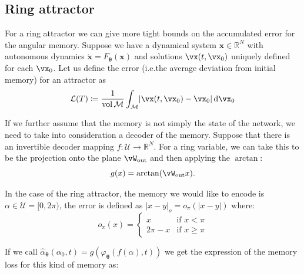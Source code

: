 \documentclass{article} %
\newcounter{ct}
\newcommand{\dm}[1]{\ensuremath{\mathrm{d}{#1}}} %
\newcommand{\wout}{\vW_{\text{out}}}
\newcommand{\manifold}{\mathcal{M}}
\DeclarePairedDelimiter{\abs}{\lvert}{\rvert}
\theoremstyle{definition}
\theoremstyle{remark}
\begin{document}
\subsection{Ring attractor}
For a ring attractor we can give more tight bounds on the accumulated error for the angular memory.
Suppose we have a dynamical system \(\bm{x} \in \mathbb{R}^N\) with autonomous dynamics \(\dot{ \bm{x}} = F_{\boldsymbol{\theta}} (\bm{x})\) and solutions \(\vx(t, \vx_0)\) uniquely defined for each \(\vx_0\).
Let us define the error (i.e.the  average deviation from initial memory) for an attractor as
\begin{align}
\mathcal{L}(T) \coloneqq
\frac{1}{\operatorname{vol}\manifold}\int_\manifold
\abs{\vx(t, \vx_0) - \vx_0}\,
\dm{\vx_0}
\end{align}

If we further assume that the memory is not simply the state of the network, we need to take into consideration a decoder of the memory.
Suppose that there is an invertible decoder mapping \(f: \mathcal{U} \rightarrow \mathbb{R}^N\). %
For a ring variable, we can take this to be the projection onto the plane \(\wout\) and then applying the \(\arctan\):
\begin{equation}
g(x) = \arctan(\wout x). %
\end{equation}

In the case of the ring attractor, the memory we would like to encode is \(\alpha \in \mathcal{U} = [0,2 \pi)\), the error is defined as \(|x-y|_o = o_\pi(|x-y|)\) where: %
\begin{equation}
    o_\pi(x) = \begin{cases}
    x & \text{if } x < \pi \\
    2 \pi - x & \text{if } x \geq \pi
    \end{cases}
\end{equation}

If we call \(\hat{\alpha}_{\boldsymbol{\theta}}(\alpha_0, t) = g(\varphi_{\bm{\theta}}(f(\alpha),t))\) we get the expression of the memory loss for this kind of memory as:
\end{document}

